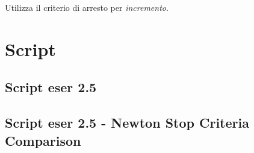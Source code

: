 Utilizza il criterio di arresto per \emph{incremento}.


\section{Script}
\subsection{Script eser 2.5}
\label{subsec:ScriptEser25}


\subsection{Script eser 2.5 - Newton Stop Criteria Comparison}
\label{subsec:ScriptEser25NewtonStopCriteriaComparison}

